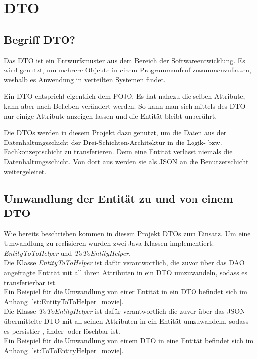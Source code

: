 \section{\acf{DTO}}
\label{sec:dto}
\authorsection{\authorSG}

\subsection{Begriff \acf{DTO}?}
\label{ssec:Was_ist_dto}
\authorsection{\authorSG}

Das \ac{DTO} ist ein Entwurfsmuster aus dem Bereich der Softwareentwicklung.
Es wird genutzt, um mehrere Objekte in einem Programmaufruf zusammenzufassen, weshalb es Anwendung in verteilten Systemen findet.

Ein \ac{DTO} entspricht eigentlich dem \ac{POJO}.
Es hat nahezu die selben Attribute, kann aber nach Belieben verändert werden.
So kann man sich mittels des \ac{DTO} nur einige Attribute anzeigen lassen und die Entität bleibt unberührt.

Die \acsp{DTO} werden in diesem Projekt dazu genutzt, um die Daten aus der Datenhaltungsschicht der Drei-Schichten-Architektur in die Logik- bzw. Fachkonzeptschicht zu transferieren. Denn eine Entität verlässt niemals die Datenhaltungsschicht.
Von dort aus werden sie als \acs{JSON} an die Benutzerschicht weitergeleitet.

\subsection{Umwandlung der Entität zu und von einem \acf{DTO}}
\label{ssec:umwandlung_dto}
\authorsection{\authorSG}

Wie bereits beschrieben kommen in diesem Projekt \acp{DTO} zum Einsatz. Um eine Umwandlung zu realisieren wurden zwei Java-Klassen implementiert: \textit{EntityToToHelper} und \textit{ToToEntityHelper}. \\

Die Klasse \textit{EntityToToHelper} ist dafür verantwortlich, die zuvor über das \acs{DAO} angefragte Entität mit all ihren Attributen in ein \acs{DTO} umzuwandeln, sodass es transferierbar ist. \\
Ein Beispiel für die Umwandlung von einer Entität in ein \acs{DTO} befindet sich im Anhang \vref{lst:EntityToToHelper_movie}. \\

Die Klasse \textit{ToToEntityHelper} ist dafür verantwortlich die zuvor über das \acs{JSON} übermittelte \acs{DTO} mit all seinen Attributen in ein Entität umzuwandeln, sodass es persistier-, änder- oder löschbar ist.\\ 
Ein Beispiel für die Umwandlung von einem \acs{DTO} in eine Entität befindet sich im Anhang \vref{lst:ToToEntityHelper_movie}.

